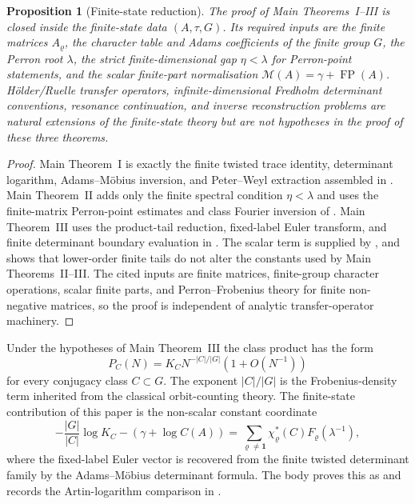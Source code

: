 \documentclass[11pt,a4paper]{amsart}
\theoremstyle{plain}
\newtheorem{proposition}[theorem]{Proposition}
\theoremstyle{definition}
\theoremstyle{remark}
\DeclareMathOperator{\FP}{FP}
\begin{document}
\begin{proposition}[Finite-state reduction]
  \label{rem:intro-finite-state-transfer-split}
  The proof of Main Theorems~I--III is closed inside the finite-state data
  \((A,\tau,G)\).  Its required inputs are the finite matrices
  \(A_\varrho\), the character table and Adams coefficients of the finite group
  \(G\), the Perron root \(\lambda\), the strict finite-dimensional gap
  \(\eta<\lambda\) for Perron-point statements, and the scalar finite-part
  normalisation \(\mathcal M(A)=\gamma+\FP(A)\).  H\"older/Ruelle transfer
  operators, infinite-dimensional Fredholm determinant conventions, resonance
  continuation, and inverse reconstruction problems are natural extensions of
  the finite-state theory but are not hypotheses in the proof of these three
  theorems.
\end{proposition}
\begin{proof}
  Main Theorem~I is exactly the finite twisted trace identity, determinant
  logarithm, Adams--M\"obius inversion, and Peter--Weyl extraction assembled in
  .  Main Theorem~II adds only the
  finite spectral condition \(\eta<\lambda\) and uses the finite-matrix
  Perron-point estimates and class Fourier inversion of
  .
  Main Theorem~III uses the product-tail reduction, fixed-label Euler transform,
  and finite determinant boundary evaluation in
  .
  The scalar term is supplied by , and
   shows that lower-order finite tails do
  not alter the constants used by Main Theorems~II--III.  The cited inputs are
  finite matrices, finite-group character operations, scalar finite parts, and
  Perron--Frobenius theory for finite non-negative matrices, so the proof is
  independent of analytic transfer-operator machinery.
\end{proof}

Under the hypotheses of Main Theorem~III the class product has the form
\[
  P_C(N)=K_C N^{-|C|/|G|}(1+O(N^{-1}))
\]
for every conjugacy class \(C\subset G\).  The exponent \(|C|/|G|\) is the
Frobenius-density term inherited from the classical orbit-counting theory.  The
finite-state contribution of this paper is the non-scalar constant coordinate
\[
  -\frac{|G|}{|C|}\log K_C-(\gamma+
  \log C(A))
  =
  \sum_{\varrho\ne\mathbf1}
    \chi_\varrho^\ast(C)F_\varrho(\lambda^{-1}),
\]
where the fixed-label Euler vector is recovered from the finite twisted
determinant family by the Adams--M\"obius determinant formula.  The body proves
this as  and records the Artin-logarithm
comparison in .
\end{document}
